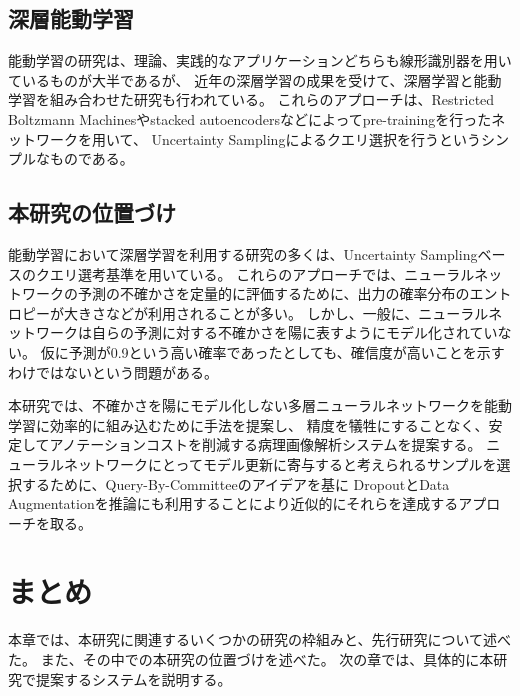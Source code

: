 \subsection{深層能動学習}
能動学習の研究は、理論、実践的なアプリケーションどちらも線形識別器を用いているものが大半であるが、
近年の深層学習の成果を受けて、深層学習と能動学習を組み合わせた研究も行われている\cite{6889457, li2016active}。
これらのアプローチは、Restricted Boltzmann Machinesやstacked autoencodersなどによってpre-trainingを行ったネットワークを用いて、
Uncertainty Samplingによるクエリ選択を行うというシンプルなものである。

\subsection{本研究の位置づけ}
能動学習において深層学習を利用する研究の多くは、Uncertainty Samplingベースのクエリ選考基準を用いている。
これらのアプローチでは、ニューラルネットワークの予測の不確かさを定量的に評価するために、出力の確率分布のエントロピーが大きさなどが利用されることが多い。
しかし、一般に、ニューラルネットワークは自らの予測に対する不確かさを陽に表すようにモデル化されていない。
仮に予測が0.9という高い確率であったとしても、確信度が高いことを示すわけではないという問題がある。

本研究では、不確かさを陽にモデル化しない多層ニューラルネットワークを能動学習に効率的に組み込むために手法を提案し、
精度を犠牲にすることなく、安定してアノテーションコストを削減する病理画像解析システムを提案する。
ニューラルネットワークにとってモデル更新に寄与すると考えられるサンプルを選択するために、Query-By-Committeeのアイデアを基に
DropoutとData Augmentationを推論にも利用することにより近似的にそれらを達成するアプローチを取る。

\section{まとめ}
本章では、本研究に関連するいくつかの研究の枠組みと、先行研究について述べた。
また、その中での本研究の位置づけを述べた。
次の章では、具体的に本研究で提案するシステムを説明する。